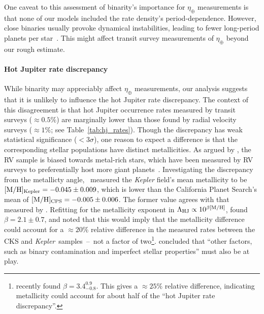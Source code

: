 \documentclass[12pt,modern]{aastex61}
\begin{document}
One caveat to this assessment of binarity's importance for 
$\eta_\oplus$ measurements is that none of our models 
included the rate density's period-dependence. However, close binaries usually
provoke dynamical instabilities, leading to fewer long-period planets per 
star~\citep[\textit{e.g.},][]{holman_long-term_1999,wang_influence_2014,
    kraus_impact_2016}.
This might affect transit survey measurements of $\eta_\oplus$ beyond our 
rough estimate.

\paragraph{Hot Jupiter rate discrepancy}
While binarity may appreciably affect $\eta_\oplus$ measurements, our analysis
suggests that it is unlikely to influence the hot Jupiter rate discrepancy.
The context of this disagreement is that hot Jupiter occurrence rates measured 
by transit surveys ($\approx 0.5\%$) are marginally lower than those found by 
radial velocity surveys ($\approx 1\%$; see Table~\ref{tab:hj_rates}).
Though the discrepancy has weak statistical significance ($<3\sigma$),
one reason to expect a difference is that the corresponding stellar 
populations have distinct metallicities.
As argued by \citet{gould_frequency_2006}, the RV sample is biased towards 
metal-rich stars, which have been measured by RV surveys to preferentially 
host more giant 
planets~\citep{santos_spectroscopic_2004,fischer_planet-metallicity_2005}.
Investigating the discrepancy from the metallicty 
angle,~\citet{guo_metallicity_2017} measured the
{\it Kepler} field's mean metallicity to be $[{\rm M/H}]_{\rm Kepler}= 
-0.045\pm0.009$, which is lower than the California Planet Search's mean of 
$[{\rm M/H}]_{\rm CPS}= -0.005\pm0.006$.
The former value agrees with that measured by \citet{dong_metallicities_2014}.
Refitting for the metallicity exponent in $\Lambda_{\rm HJ} \propto 10^{\beta 
    [{\rm M/H}] }$, \citeauthor{guo_metallicity_2017}\! found $\beta = 2.1\pm 
0.7$, and noted that this would imply that the metallicity difference could 
account for a $\approx 20\%$ relative difference in the measured rates between 
the CKS and {\it Kepler}\ samples~--~not a factor of two\footnote{
    \citet{petigura_CKS_2017} recently found $\beta = 3.4^{0.9}_{-0.8}$.
    This gives a $\approx 25\%$ relative difference, indicating metallicity 
    could 
    account for about half of the ``hot Jupiter rate discrepancy''.
}.
\citeauthor{guo_metallicity_2017}\! concluded that ``other factors, such as 
binary contamination and imperfect stellar properties'' must also be at play.
\end{document}
